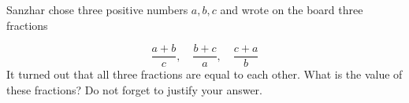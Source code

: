 Sanzhar chose three positive numbers $a, b, c$ and wrote on the board three fractions

$$
\dfrac{a+b}{c}, \quad \dfrac{b+c}{a}, \quad \dfrac{c+a}{b}
$$It turned out that all three fractions are equal to each other. What is the value of these fractions? Do not forget to justify your answer.
